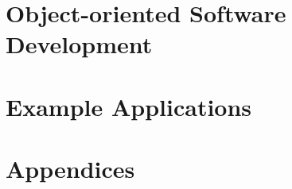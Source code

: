\documentclass[letterpaper,twoside,12pt]{book}
\begin{document}










\part{Object-oriented Software Development}







\part{Example Applications}








\part{Appendices}
\appendix







% 

\backmatter


\small
\printindex
\end{document}

